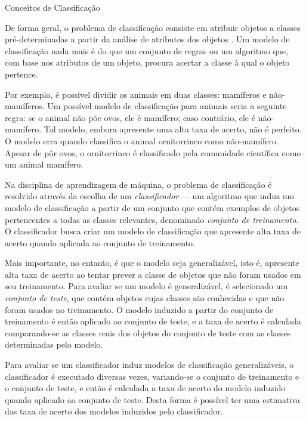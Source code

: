\begin{section}{Conceitos de Classificação} \label{cap:clas1}
	
	De forma geral, o problema de classificação consiste em atribuir objetos a classes pré-determinadas a partir da análise de atributos dos objetos \cite{Tan2005}. Um modelo de classificação nada mais é do que um conjunto de regras ou um algoritmo que, com base nos atributos de um objeto, procura acertar a classe à qual o objeto pertence. 

	Por exemplo, é possível dividir os animais em duas classes: mamíferos e não-mamíferos. Um possível modelo de classificação para animais seria a seguinte regra: se o animal não põe ovos, ele é mamífero; caso contrário, ele é não-mamífero. Tal modelo, embora apresente uma alta taxa de acerto, não é perfeito. O modelo erra quando classifica o animal ornitorrinco como não-mamífero. Apesar de pôr ovos, o ornitorrinco é classificado pela comunidade científica como um animal mamífero.
	
	
	
	Na disciplina de aprendizagem de máquina, o problema de classificação é resolvido através da escolha de um \emph{classificador} --- um algoritmo que induz um modelo de classificação a partir de um conjunto que contém exemplos de objetos pertencentes a todas as classes relevantes, denominado \emph{conjunto de treinamento}. O classificador busca criar um modelo de classificação que apresente alta taxa de acerto quando aplicada ao conjunto de treinamento. 
	
	Mais importante, no entanto, é que o modelo seja generalizável, isto é, apresente alta taxa de acerto ao tentar prever a classe de objetos que não foram usados em seu treinamento. Para avaliar se um modelo é generalizável, é selecionado um \emph{conjunto de teste}, que contém objetos cujas classes são conhecidas e que não foram usados no treinamento. O modelo induzido a partir do conjunto de treinamento é então aplicado ao conjunto de teste, e a taxa de acerto é calculada comparando-se as classes reais dos objetos do conjunto de teste com as classes determinadas pelo modelo.
	
	Para avaliar se um classificador induz modelos de classificação generalizáveis, o classificador é executado diversas vezes, variando-se o conjunto de treinamento e o conjunto de teste, e então é calculada a taxa de acerto do modelo induzido quando aplicado ao conjunto de teste. Desta forma é possível ter uma estimativa das taxa de acerto dos modelos induzidos pelo classificador.
	
\end{section}	
	
